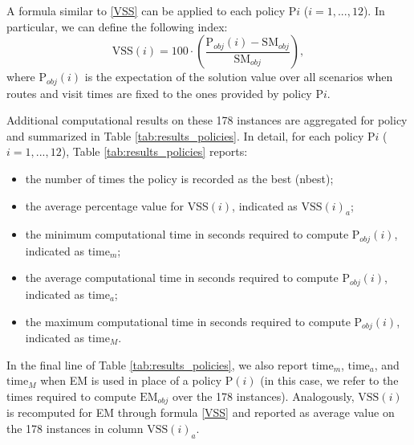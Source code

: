 \documentclass[preprint,11pt,authoryear]{elsarticle}
\begin{document}
A formula similar to \eqref{VSS} can be applied to each policy P$i$  ($i=1,...,12$). In particular, we can define the following index: 
$$ \text{VSS}(i) = 100 \cdot \left( \frac{\text{P}_{obj}(i) - \text{SM}_{obj}}{\text{SM}_{obj}} \right),$$
where $\text{P}_{obj}(i)$ is the expectation of the solution value over all scenarios when routes and visit times are fixed to the ones provided by policy P$i$. 

Additional computational results on these 178 instances are aggregated for policy and summarized in Table \ref{tab:results_policies}. 
In detail, for each policy P$i$  ($i=1,...,12$), Table \ref{tab:results_policies} reports: 
\begin{itemize}
\item the number of times the policy is recorded as the best (nbest);
\item the average percentage value for VSS$(i)$, indicated as $\text{VSS}(i)_a$;
\item the minimum computational time in seconds required to compute $\text{P}_{obj}(i)$, indicated as $\text{time}_m$;
\item the average computational time in seconds required to compute  $\text{P}_{obj}(i)$, indicated as $\text{time}_a$; 
\item the maximum computational time in seconds required to compute $\text{P}_{obj}(i)$, indicated as $\text{time}_M$. 
\end{itemize} 
In the final line of Table \ref{tab:results_policies}, we also report $\text{time}_m$, $\text{time}_a$, and $\text{time}_M$ when EM is used in place of a policy P$(i)$ (in this case, we refer to the times required to compute $\text{EM}_{obj}$ over the 178 instances). Analogously, $\text{VSS}(i)$ is recomputed for EM through formula \eqref{VSS} and reported as average value on the 178 instances in column $\text{VSS}(i)_a$.        


\end{document}
